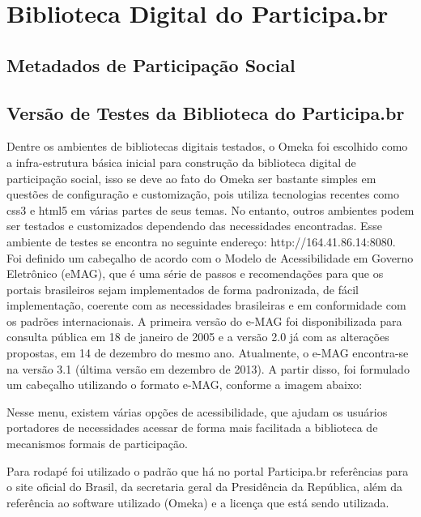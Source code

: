 \chapter{Biblioteca Digital do Participa.br}

\section{Metadados de Participação Social}

\section{Versão de Testes da Biblioteca do Participa.br}

Dentre os ambientes de bibliotecas digitais testados, o Omeka foi escolhido como a infra-estrutura básica inicial para construção da biblioteca digital de participação social, isso se deve ao fato do Omeka ser bastante simples em questões de configuração e customização, pois utiliza tecnologias recentes como css3 e html5 em várias partes de seus temas. No entanto, outros ambientes podem ser testados e customizados dependendo das necessidades encontradas. Esse ambiente de testes se encontra no seguinte endereço: http://164.41.86.14:8080.
%
Foi definido um cabeçalho de acordo com o Modelo de Acessibilidade em Governo Eletrônico (eMAG), que é uma série de passos e recomendações para que os portais brasileiros sejam implementados de forma padronizada, de fácil implementação, coerente com as necessidades brasileiras e em conformidade com os padrões internacionais. A primeira versão do e-MAG foi disponibilizada para consulta pública em 18 de janeiro de 2005 e a versão 2.0 já com as alterações propostas, em 14 de dezembro do mesmo ano. Atualmente, o e-MAG encontra-se na versão 3.1 (última versão em dezembro de 2013). 
A partir disso, foi formulado um cabeçalho utilizando o formato e-MAG, conforme a imagem abaixo:


Nesse menu, existem várias opções de acessibilidade, que ajudam os usuários portadores de necessidades acessar de forma mais facilitada a biblioteca de mecanismos formais de participação.

Para rodapé foi utilizado o padrão que há no portal Participa.br referências para o site oficial do Brasil, da secretaria geral da Presidência da República, além da referência ao software utilizado (Omeka) e a licença que está sendo utilizada.


